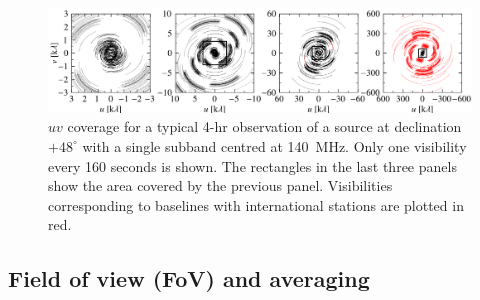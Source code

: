\documentclass[graybox]{svmult}
\begin{document}
\begin{figure}[t]
\begin{center}
\includegraphics[width=\textwidth]{figures/uv_cov.png}
\caption{$uv$ coverage for a typical 4-hr observation of a source at declination
$+48^{\circ}$ with a single subband centred at 140~MHz. Only one visibility every 160 seconds is shown. The rectangles in the last three panels show the area covered by the previous panel. Visibilities corresponding to baselines with international
stations are plotted in red.}
\label{fig:uvcoverage}
\end{center}
\end{figure}

%


\subsection{Field of view (FoV) and averaging}\label{sec:fov}
\end{document}
